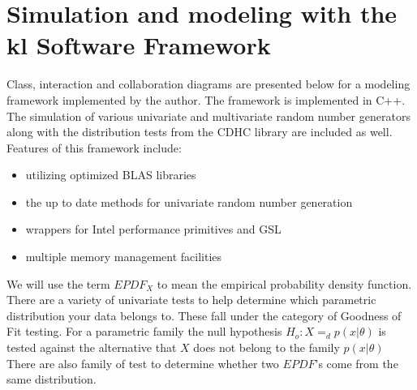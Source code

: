 \section*{Simulation and modeling with the kl Software
Framework}Class, interaction and collaboration diagrams are presented below for a modeling framework implemented by the author. The framework is implemented in C++.  The simulation of various univariate and multivariate random number generators along with the distribution tests from the CDHC library are included as well.
Features of this framework include:
\begin{itemize}
\item utilizing optimized BLAS libraries
\item the up to date methods for univariate random number generation
\item wrappers for Intel performance primitives and GSL
\item multiple memory management facilities
\end{itemize}
We will use the term $EPDF_X$ to mean the empirical probability density function. There are a variety of univariate tests to help determine which parametric distribution your data belongs to. These fall under the category of Goodness of Fit testing. For a parametric family the null hypothesis $H_o : X=_d p(x| \theta)$ is tested against the alternative that $X$ does not belong to the family $p(x|\theta)$ There are also family of test to determine whether two $EPDF$'s come from the same distribution. 